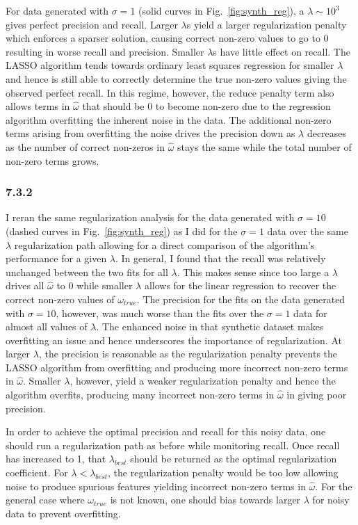 \documentclass[12pt]{amsart}
\begin{document}
For data generated with $\sigma = 1$ (solid curves in Fig.~\ref{fig:synth_reg}), a $\lambda \sim 10^3$ gives perfect precision and recall.  Larger $\lambda$s yield a larger regularization penalty which enforces a sparser solution, causing correct non-zero values to go to 0 resulting in worse recall and precision.  Smaller $\lambda$s have little effect on recall.  The LASSO algorithm tends towards ordinary least squares regression for smaller $\lambda$ and hence is still able to correctly determine the true non-zero values giving the observed perfect recall.  In this regime, however, the reduce penalty term also allows terms in $\hat{\omega}$ that should be 0 to become non-zero due to the regression algorithm overfitting the inherent noise in the data.  The additional non-zero terms arising from overfitting the noise drives the precision down as $\lambda$ decreases as the number of correct non-zeros in $\hat{\omega}$ stays the same while the total number of non-zero terms grows.

\subsubsection*{7.3.2}

I reran the same regularization analysis for the data generated with $\sigma = 10$ (dashed curves in Fig.~\ref{fig:synth_reg}) as I did for the $\sigma = 1$ data over the same $\lambda$ regularization path allowing for a direct comparison of the algorithm's performance for a given $\lambda$.  In general, I found that the recall was relatively unchanged between the two fits for all $\lambda$.  This makes sense since too large a $\lambda$ drives all $\hat{\omega}$ to 0 while smaller $\lambda$ allows for the linear regression to recover the correct non-zero values of $\omega_{true}$.  The precision for the fits on the data generated with $\sigma = 10$, however, was much worse than the fits over the $\sigma = 1$ data for almost all values of $\lambda$.  The enhanced noise in that synthetic dataset makes overfitting an issue and hence underscores the importance of regularization.  At larger $\lambda$, the precision is reasonable as the regularization penalty prevents the LASSO algorithm from overfitting and producing more incorrect non-zero terms in $\hat{\omega}$.  Smaller $\lambda$, however, yield a weaker regularization penalty and hence the algorithm overfits, producing many incorrect non-zero terms in $\hat{\omega}$ in giving poor precision.  

In order to achieve the optimal precision and recall for this noisy data, one should run a regularization path as before while monitoring recall.  Once recall has increased to 1, that $\lambda_{best}$ should be returned as the optimal regularization coefficient.  For $\lambda < \lambda_{best}$, the regularization penalty would be too low allowing noise to produce spurious features yielding incorrect non-zero terms in $\hat{\omega}$.  For the general case where $\omega_{true}$ is not known, one should bias towards larger $\lambda$ for noisy data to prevent overfitting.
\end{document}
